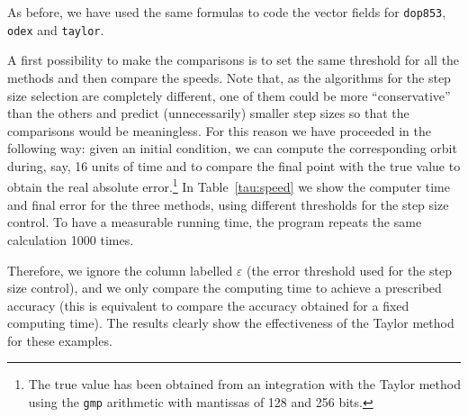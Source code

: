 \documentclass[12pt,twoside]{article}
\begin{document}
As before, we have used the same formulas to code the vector fields
for \texttt{dop853}, \texttt{odex} and \texttt{taylor}.

A first possibility to make the comparisons is to set the same
threshold for all the methods and then compare the speeds. Note that,
as the algorithms for the step size selection are completely
different, one of them could be more ``conservative'' than the others
and predict (unnecessarily) smaller step sizes so that the comparisons
would be meaningless. For this reason we have proceeded in the
following way: given an initial condition, we can compute the
corresponding orbit during, say, 16 units of time and to compare the
final point with the true value to obtain the real absolute
error.\footnote{The true value has been obtained from an integration
  with the Taylor method using the \texttt{gmp} arithmetic with
  mantissas of 128 and 256 bits.} In Table~\ref{tau:speed} we show the
computer time and final error for the three methods, using different
thresholds for the step size control. To have a measurable running
time, the program repeats the same calculation 1000 times.

Therefore, we ignore the column labelled $\varepsilon$ (the error
threshold used for the step size control), and we only compare the
computing time to achieve a prescribed accuracy (this is equivalent to
compare the accuracy obtained for a fixed computing time). The results
clearly show the effectiveness of the Taylor method for these
examples.
\end{document}

